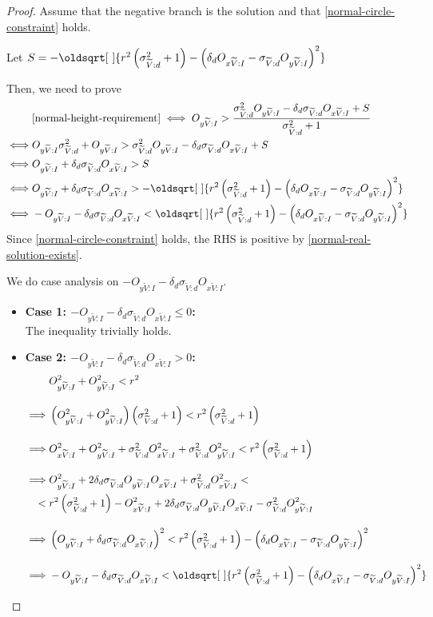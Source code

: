 \documentclass[a4paper,12pt]{article}
\newcommand{\HSview}[1][V]{\widetilde{#1}}
\newcommand{\HSOx}[1][I]{O_{x\HSview:#1}}
\newcommand{\HSOy}[1][I]{O_{y\HSview:#1}}
\newcommand{\HSdelta}[1][d]{\delta_{#1}}
\newcommand{\HSsigma}[1][d]{\sigma_{\HSview:#1}}
\renewcommand*{\sqrt}[2][\ ]{\oldsqrt[#1]{#2} }
\theoremstyle{definition}
\theoremstyle{plain}
\begin{document}
	\begin{proof}
		Assume that the negative branch is the solution and that \eqref{normal-circle-constraint} holds.

		Let $S = -\sqrt{r^2\left(\HSsigma^2 + 1\right) - \left(\HSdelta \HSOx - \HSsigma \HSOy\right)^2}$

		Then, we need to prove
		\begin{align*}
			&\eqref{normal-height-requirement} \iff \HSOy > \frac{\HSsigma^2\HSOy - \HSdelta\HSsigma\HSOx + S}{\HSsigma^2 + 1}\\
			\iff& \HSOy\HSsigma^2 + \HSOy > \HSsigma^2\HSOy - \HSdelta\HSsigma\HSOx + S\\
			\iff& \HSOy + \HSdelta\HSsigma\HSOx > S\\
			\iff& \HSOy + \HSdelta\HSsigma\HSOx > -\sqrt{r^2\left(\HSsigma^2 + 1\right) - \left(\HSdelta \HSOx - \HSsigma \HSOy\right)^2}\\
			\iff& -\HSOy - \HSdelta\HSsigma\HSOx < \sqrt{r^2\left(\HSsigma^2 + 1\right) - \left(\HSdelta \HSOx - \HSsigma \HSOy\right)^2}
		\end{align*}
		Since \eqref{normal-circle-constraint} holds, the RHS is positive by \ref{normal-real-solution-exists}.

		We do case analysis on $-\HSOy - \HSdelta\HSsigma\HSOx$.
		\begin{itemize}
			\item \textbf{Case 1: $-\HSOy - \HSdelta\HSsigma\HSOx \le 0$:}\\
			
			The inequality trivially holds.
			\item \textbf{Case 2: $-\HSOy - \HSdelta\HSsigma\HSOx > 0$:}\\
				\begin{align*}
					&\HSOy^2 + \HSOy^2 < r^2\\[1em]
					\implies & \left(\HSOy^2 + \HSOy^2\right)\left(\HSsigma^2 + 1\right) < r^2\left(\HSsigma^2 + 1\right)\\[1em]
					\implies & \HSOx^2 + \HSOy^2 + \HSsigma^2\HSOx^2 + \HSsigma^2\HSOy^2 < r^2\left(\HSsigma^2 + 1\right)\\[1em]
					\implies & \HSOy^2 + 2\HSdelta\HSsigma\HSOy\HSOx + \HSsigma^2\HSOx^2 <{}\\
					{}<{}& r^2\left(\HSsigma^2 + 1\right) - \HSOx^2 + 2\HSdelta\HSsigma\HSOy\HSOx - \HSsigma^2\HSOy^2\\[1em]
					\implies&\left(\HSOy + \HSdelta\HSsigma\HSOx\right)^2 < r^2\left(\HSsigma^2 + 1\right) - \left(\HSdelta \HSOx - \HSsigma \HSOy\right)^2\\[1em]
					\implies& -\HSOy - \HSdelta\HSsigma\HSOx < \sqrt{r^2\left(\HSsigma^2 + 1\right) - \left(\HSdelta \HSOx - \HSsigma \HSOy\right)^2}
				\end{align*}

		\end{itemize}

	\end{proof}
\end{document}
